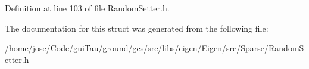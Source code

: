 Definition at line 103 of file Random\-Setter.\-h.



The documentation for this struct was generated from the following file\-:\begin{DoxyCompactItemize}
\item 
/home/jose/\-Code/gui\-Tau/ground/gcs/src/libs/eigen/\-Eigen/src/\-Sparse/\hyperlink{_random_setter_8h}{Random\-Setter.\-h}\end{DoxyCompactItemize}
